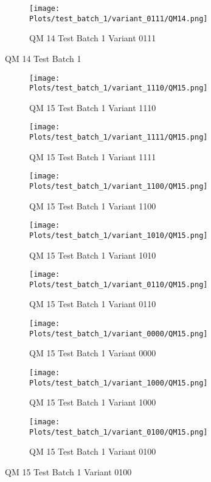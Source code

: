 \documentclass{DissertateFigs}
\begin{document}
\begin{figure}[t!]
\medskip

    \begin{subfigure}{0.47\textwidth}
    \texttt{[image: Plots/test\_batch\_1/variant\_0111/QM14.png]}
    \caption{QM 14 Test Batch 1 Variant 0111}
    \end{subfigure}
\caption{QM 14 Test Batch 1}
    \end{figure}
\clearpage
\begin{figure}[t!]
    \begin{subfigure}{0.32\textwidth}
    \texttt{[image: Plots/test\_batch\_1/variant\_1110/QM15.png]}
    \caption{QM 15 Test Batch 1 Variant 1110}
    \end{subfigure}
    \begin{subfigure}{0.32\textwidth}
    \texttt{[image: Plots/test\_batch\_1/variant\_1111/QM15.png]}
    \caption{QM 15 Test Batch 1 Variant 1111}
    \end{subfigure}

\medskip

    \begin{subfigure}{0.32\textwidth}
    \texttt{[image: Plots/test\_batch\_1/variant\_1100/QM15.png]}
    \caption{QM 15 Test Batch 1 Variant 1100}
    \end{subfigure}
    \begin{subfigure}{0.32\textwidth}
    \texttt{[image: Plots/test\_batch\_1/variant\_1010/QM15.png]}
    \caption{QM 15 Test Batch 1 Variant 1010}
    \end{subfigure}

\medskip

    \begin{subfigure}{0.32\textwidth}
    \texttt{[image: Plots/test\_batch\_1/variant\_0110/QM15.png]}
    \caption{QM 15 Test Batch 1 Variant 0110}
    \end{subfigure}
    \begin{subfigure}{0.32\textwidth}
    \texttt{[image: Plots/test\_batch\_1/variant\_0000/QM15.png]}
    \caption{QM 15 Test Batch 1 Variant 0000}
    \end{subfigure}

\medskip

    \begin{subfigure}{0.32\textwidth}
    \texttt{[image: Plots/test\_batch\_1/variant\_1000/QM15.png]}
    \caption{QM 15 Test Batch 1 Variant 1000}
    \end{subfigure}
    \begin{subfigure}{0.32\textwidth}
    \texttt{[image: Plots/test\_batch\_1/variant\_0100/QM15.png]}
    \caption{QM 15 Test Batch 1 Variant 0100}
    \end{subfigure}


\end{figure}
\end{document}
